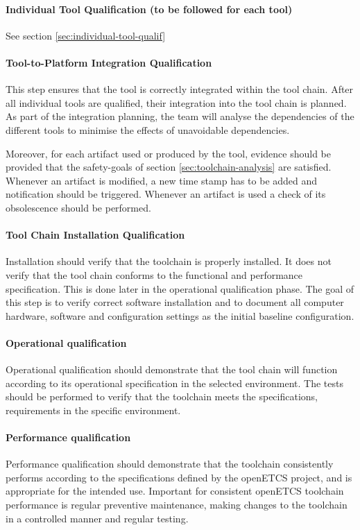 \paragraph{Individual Tool Qualification (to be followed for each tool)}
See section \ref{sec:individual-tool-qualif}

\paragraph{Tool-to-Platform Integration Qualification}
This step ensures that the tool is correctly integrated within the tool chain.
After all individual tools are qualified, their integration into the
tool chain is planned. As part of the integration planning, the team
will analyse the dependencies of the different tools to minimise the
effects of unavoidable dependencies.

Moreover, for each artifact used or produced by the tool, evidence
should be provided that the safety-goals of section
\ref{sec:toolchain-analysis} are satisfied. 
Whenever an artifact is modified, a new time stamp has to be added and
notification should be triggered. Whenever an artifact is used a check
of its obsolescence should be performed.

\paragraph{Tool Chain Installation Qualification}
Installation should verify that the toolchain is properly
installed. It does not verify that the tool chain conforms to the functional and performance specification. This is done later in the operational qualification phase. The goal of this step is to verify correct software installation and to document all computer hardware, software and configuration settings as the initial baseline configuration.

\paragraph{Operational qualification}
Operational qualification should demonstrate that the tool chain will function according to its operational specification in the selected environment. The tests should be performed to verify that the toolchain meets the specifications, requirements in the specific environment.

\paragraph{Performance qualification}
Performance qualification should demonstrate that the toolchain consistently performs according to the specifications defined by the openETCS project, and is appropriate for the intended use. Important for consistent openETCS toolchain performance is regular preventive maintenance, making changes to the toolchain in a controlled manner and regular testing.


